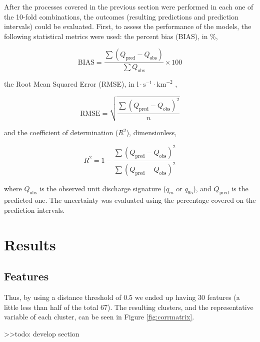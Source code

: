 \documentclass[12pt]{article}
\begin{document}
\par After the processes covered in the previous section were performed in each one of the 10-fold combinations, the outcomes (resulting predictions and prediction intervals) could be evaluated. First, to assess the performance of the models, the following statistical metrics were used:
the percent bias (BIAS), in \%,
\begin{linenomath*}
\begin{equation}
\label{eq:bias}
\text{BIAS} = \frac{\sum (Q_{\text{pred}} - Q_{\text{obs}})}{\sum Q_{\text{obs}}} \times 100
\end{equation}
\end{linenomath*}
the Root Mean Squared Error (RMSE), in $\text{l}\cdot \text{s}^{-1}\cdot \text{km}^{-2}$ ,
\begin{linenomath*}
\begin{equation}
\label{eq:rmse}
\text{RMSE} = \sqrt{ \frac{\sum (Q_{\text{pred}} - Q_{\text{obs}})^2}{n}}
\end{equation}
\end{linenomath*}
and the coefficient of determination ($R^2$), dimensionless,
\begin{linenomath*}
\begin{equation}
\label{eq:r2}
R^2 = 1 - \frac{\sum (Q_{\text{pred}} - Q_{\text{obs}})^2}{\sum (Q_{\text{pred}} - \overline{Q}_{\text{obs}})^2}
\end{equation}
\end{linenomath*}
where $Q_{\text{obs}}$ is the observed unit discharge signature ($q_{m}$ or $q_{95}$), and $Q_{\text{pred}}$ is the predicted one. The uncertainty was evaluated using the percentage covered on the prediction intervals.

\section{Results} \label{sec:results}

\subsection{Features}

\par Thus, by using a distance threshold of 0.5 we ended up having 30 features (a little less than half of the total 67). The resulting clusters, and the representative variable of each cluster, can be seen in Figure \ref{fig:corrmatrix}.

\par >>todo: develop section
\end{document}
